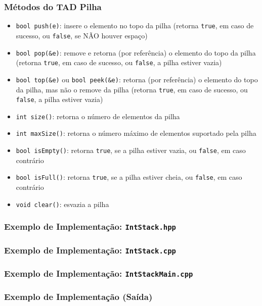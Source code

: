 \documentclass[aspectratio=169]{beamer}
\begin{document}
\begin{frame}\frametitle{Métodos do TAD Pilha}
\begin{itemize}
	\item \texttt{bool push(e)}: insere o elemento no topo da pilha (retorna \texttt{true}, em caso de sucesso, ou \texttt{false}, se NÃO houver espaço)
	\item \texttt{bool pop(\&e)}: remove e retorna (por referência) o elemento do topo da pilha (retorna \texttt{true}, em caso de sucesso, ou \texttt{false}, a pilha estiver vazia)
	\item \texttt{bool top(\&e)} ou \texttt{bool peek(\&e)}: retorna (por referência) o elemento do topo da pilha, mas não o remove da pilha (retorna \texttt{true}, em caso de sucesso, ou \texttt{false}, a pilha estiver vazia)
	\item \texttt{int size()}: retorna o número de elementos da pilha
	\item \texttt{int maxSize()}: retorna o número máximo de elementos suportado pela pilha
	\item \texttt{bool isEmpty()}: retorna \texttt{true}, se a pilha estiver vazia, ou \texttt{false}, em caso contrário
	\item \texttt{bool isFull()}: retorna \texttt{true}, se a pilha estiver cheia, ou \texttt{false}, em caso contrário
	\item \texttt{void clear()}: esvazia a pilha
\end{itemize}
\end{frame}

\begin{frame}\frametitle{Exemplo de Implementação: \texttt{IntStack.hpp}}

\end{frame}

\begin{frame}\frametitle{Exemplo de Implementação: \texttt{IntStack.cpp}}
\fontsize{3pt}{5pt}\selectfont{

}
\end{frame}
	
\begin{frame}\frametitle{Exemplo de Implementação: \texttt{IntStackMain.cpp}}
\fontsize{5pt}{6pt}\selectfont{

}
\end{frame}
\begin{frame}\frametitle{Exemplo de Implementação (Saída)}

\end{frame}
\end{document}
